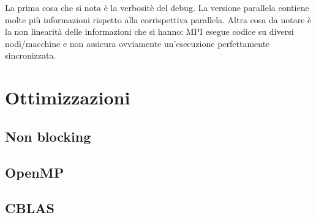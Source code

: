 La prima cosa che si nota \`{e} la verbosit\`{e} del debug. La versione parallela contiene molte pi\`{u} informazioni rispetto alla corrispettiva parallela. Altra cosa da notare \`{e} la non linearit\`{a} delle informazioni che si hanno: MPI esegue codice su diversi nodi/macchine e non assicura ovviamente un'esecuzione perfettamente sincronizzata.

\section{Ottimizzazioni}

\subsection{Non blocking}

\subsection{OpenMP}

\subsection{CBLAS}
